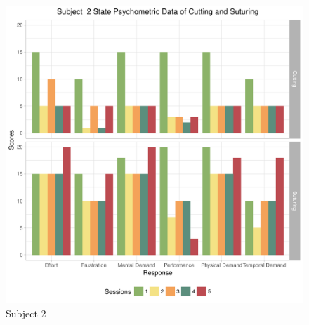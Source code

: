 \documentclass[12pt,epsf]{report}
\begin{document}
{\begin{figure}[!htb]
\begin{minipage}[c]{0.5\linewidth}
	\includegraphics[width=\linewidth]{subject02_State_Psychometric_Data_of_Cutting_and_Suturing.pdf}
	\caption{Subject 2}
	\end{minipage}
\end{figure}
\FloatBarrier
}
\end{document}
